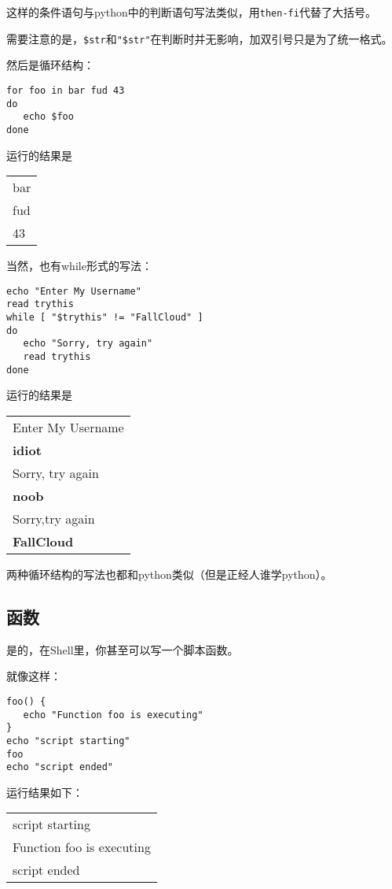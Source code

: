 \documentclass[UTF8]{article}
\begin{document}
这样的条件语句与python中的判断语句写法类似，用\verb|then-fi|代替了大括号。

需要注意的是，\verb|$str|和\verb|"$str"|在判断时并无影响，加双引号只是为了统一格式。

然后是循环结构：

\begin{verbatim}
for foo in bar fud 43
do
   echo $foo
done
\end{verbatim}

运行的结果是

\begin{tabular}{|l|}
  \hline
bar\\
fud\\
43\\
\hline
\end{tabular}

当然，也有while形式的写法：
\begin{verbatim}
echo "Enter My Username"
read trythis
while [ "$trythis" != "FallCloud" ]
do
   echo "Sorry, try again"
   read trythis
done
\end{verbatim}

运行的结果是

\begin{tabular}{|l|}
  \hline
Enter My Username\\
\textbf{idiot}\\
Sorry, try again\\
\textbf{noob}\\
Sorry,try again\\
\textbf{FallCloud}\\
\hline
\end{tabular}

两种循环结构的写法也都和python类似（但是正经人谁学python）。

\subsection{函数}

是的，在Shell里，你甚至可以写一个脚本函数。

就像这样：

\begin{verbatim}
foo() {
   echo "Function foo is executing"
}
echo "script starting"
foo
echo "script ended"
\end{verbatim}

运行结果如下：

\begin{tabular}{|l|}
\hline
  script starting\\
Function foo is executing\\
script ended\\
\hline
\end{tabular}
\end{document}
